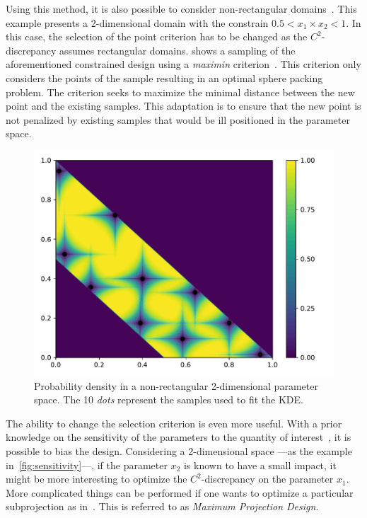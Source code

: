 

Using this method, it is also possible to consider non-rectangular domains~\citep{Lekivetz2015}. This example presents a 2-dimensional domain with the constrain $0.5 < x_1 \times x_2 < 1$. In this case, the selection of the point criterion has to be changed as the $C^2$-discrepancy assumes rectangular domains.  shows a sampling of the aforementioned constrained design using a \emph{maximin} criterion~\citep{Fang2006}. This criterion only considers the points of the sample resulting in an optimal sphere packing problem. The criterion seeks to maximize the minimal distance between the new point and the existing samples. This adaptation is to ensure that the new point is not penalized by existing samples that would be ill positioned in the parameter space.

\begin{figure}[!h]
\centering
\includegraphics[width=0.9\linewidth,keepaspectratio]{fig/contributions/doe/10_star_constrain.pdf}
\caption{Probability density in a non-rectangular 2-dimensional parameter space. The 10 \emph{dots} represent the samples used to fit the KDE.}
\label{fig:constrain}
\end{figure}

The ability to change the selection criterion is even more useful. With a prior knowledge on the sensitivity of the parameters to the quantity of interest~\citep{saltelli2007}, it is possible to bias the design. Considering a 2-dimensional space ---\thinspace as the example in~\cref{fig:sensitivity}\thinspace---, if the parameter $x_2$ is known to have a small impact, it might be more interesting to optimize the $C^2$-discrepancy on the parameter $x_1$. More complicated things can be performed if one wants to optimize a particular subprojection as in~\citep{Joseph2015}. This is referred to as \emph{Maximum Projection Design}.

